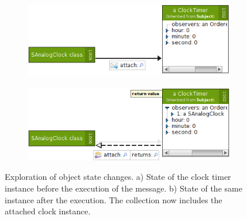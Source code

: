 \begin{figure}[b]
	\centering
	
	\begin{subfigure}{0.45\textwidth}
		\centering
		\includegraphics[width=\textwidth]{../images/04-ImplExplorationState1}
		\caption[Object State Before Message Execution]{}
		\label{fig:ImplementationExplorationStateBefore}
	\end{subfigure}
	\quad
	\begin{subfigure}{0.45\textwidth}
		\centering
		\includegraphics[width=\textwidth]{../images/04-ImplExplorationState2}
		\caption[Object State After Message Execution]{}
		\label{fig:ImplementationExplorationStateAfter}
	\end{subfigure}
	
	\caption[Exploration of Object State Changes]{Exploration of object state changes. a) State of the clock timer instance before the execution of the  message. b) State of the same instance after the execution. The  collection now includes the attached clock instance.}
	\label{fig:ImplementationExplorationState}
\end{figure}

